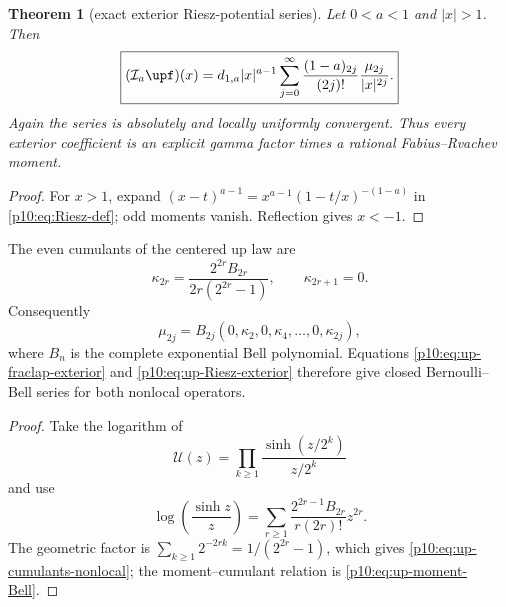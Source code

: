\documentclass[11pt,oneside]{article}
\newtheorem{theorem}{Theorem}[section]
\theoremstyle{definition}
\theoremstyle{remark}
\newcommand{\1}{\mathbf 1}
\begin{document}
\begin{theorem}[exact exterior Riesz-potential series]
\label{p10:thm:up-Riesz-exterior}
Let \(0<a<1\) and \(|x|>1\).  Then
\begin{equation}\label{p10:eq:up-Riesz-exterior}
 \boxed{
 (\mathcal I_a\upf)(x)
 =d_{1,a}|x|^{a-1}
  \sum_{j=0}^{\infty}
   \frac{(1-a)_{2j}}{(2j)!}
   \frac{\mu_{2j}}{|x|^{2j}}.}
\end{equation}
Again the series is absolutely and locally uniformly convergent.  Thus every exterior
coefficient is an explicit gamma factor times a rational Fabius--Rvachev moment.
\end{theorem}

\begin{proof}
For \(x>1\), expand
\(
 (x-t)^{a-1}=x^{a-1}(1-t/x)^{-(1-a)}
\)
in \eqref{p10:eq:Riesz-def}; odd moments vanish.  Reflection gives \(x<-1\).
\end{proof}

\begin{proposition}
\label{p10:prop:up-cumulants-nonlocal}
The even cumulants of the centered up law are
\begin{equation}\label{p10:eq:up-cumulants-nonlocal}
 \kappa_{2r}
 =\frac{2^{2r}B_{2r}}{2r(2^{2r}-1)},
 \qquad \kappa_{2r+1}=0.
\end{equation}
Consequently
\begin{equation}\label{p10:eq:up-moment-Bell}
 \mu_{2j}=B_{2j}(0,\kappa_2,0,\kappa_4,\ldots,0,\kappa_{2j}),
\end{equation}
where \(B_n\) is the complete exponential Bell polynomial.  Equations
\eqref{p10:eq:up-fraclap-exterior} and \eqref{p10:eq:up-Riesz-exterior} therefore give
closed Bernoulli--Bell series for both nonlocal operators.
\end{proposition}

\begin{proof}
Take the logarithm of
\begin{equation*}
 \mathcal U(z)=\prod_{k\ge1}\frac{\sinh(z/2^k)}{z/2^k}
\end{equation*}
and use
\begin{equation*}
 \log\!\left(\frac{\sinh z}{z}\right)
 =\sum_{r\ge1}\frac{2^{2r-1}B_{2r}}{r(2r)!}z^{2r}.
\end{equation*}
The geometric factor is
\(\sum_{k\ge1}2^{-2rk}=1/(2^{2r}-1)\), which gives
\eqref{p10:eq:up-cumulants-nonlocal}; the moment--cumulant relation is
\eqref{p10:eq:up-moment-Bell}.
\end{proof}
\end{document}
